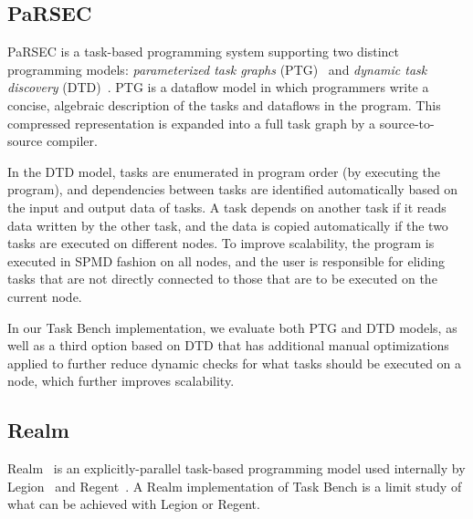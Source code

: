 \subsection{PaRSEC}

PaRSEC is a task-based programming system supporting two distinct
programming models: \emph{parameterized task graphs}
(PTG)~\cite{PARSEC13} and \emph{dynamic task discovery}
(DTD)~\cite{PARSEC_DTD}.  PTG is a dataflow model in which programmers
write a concise, algebraic description of the tasks and dataflows in
the program. This compressed representation is expanded into a full
task graph by a source-to-source compiler.

In the DTD model, tasks are enumerated in program order (by
executing the program), and dependencies between tasks are
identified automatically based on the input and output data of tasks. 
A task depends on another task if it reads data written by the other task,
and the data is copied automatically if the two tasks are executed on
different nodes. To
improve scalability, the program is executed in
SPMD fashion on all nodes, and the user is responsible for eliding
tasks that are not directly connected to those that are to be executed
on the current node.

In our Task Bench implementation, we evaluate both PTG and DTD models,
as well as a third option based on DTD that has additional manual
optimizations applied to further reduce dynamic checks for what tasks
should be executed on a node, which further improves
scalability.


\subsection{Realm}

Realm~\cite{Realm14} is an explicitly-parallel task-based programming
model used internally by Legion~\cite{Legion12} and
Regent~\cite{Regent15}. A Realm implementation of Task Bench is a limit study of what can be achieved with Legion or Regent.

